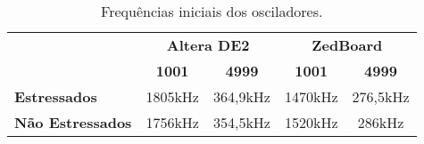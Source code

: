\begin{table}[H]
\centering
\caption{Frequências iniciais dos osciladores.}
\begin{tabular}{l|cc|cc|}
\cline{2-5}
 & \multicolumn{2}{c|}{\textbf{Altera DE2}} & \multicolumn{2}{c|}{\textbf{ZedBoard}} \\ \cline{2-5} 
 & \multicolumn{1}{c|}{\textbf{1001}} & \textbf{4999} & \multicolumn{1}{c|}{\textbf{1001}} & \textbf{4999} \\ \hline
\multicolumn{1}{|l|}{\textbf{Estressados}} & \multicolumn{1}{c|}{1805kHz} & 364,9kHz & \multicolumn{1}{c|}{1470kHz} & 276,5kHz \\ \hline
\multicolumn{1}{|l|}{\textbf{Não Estressados}} & \multicolumn{1}{c|}{1756kHz} & 354,5kHz & \multicolumn{1}{c|}{1520kHz} & 286kHz \\ \hline
\end{tabular}
\label{tab:FreqIniciais}
\end{table}